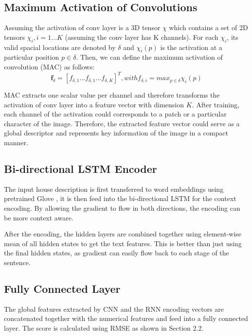 \documentclass{article} %
\begin{document}
\subsection{Maximum Activation of Convolutions}

Assuming the activation of conv layer is a 3D tensor $\chi$
which contains a set of 2D tensors $\chi_i, i = 1...K$
(assuming the conv layer has K channels).
For each $\chi_i$, its valid spacial locations are denoted by $\delta$
and $\chi_i(p)$ is the activation at a particular position $p \in \delta$.
Then, we can define the maximum activation of convolution (MAC) as follows\cite{salvador2016faster}:
\begin{equation*}
\textbf{f}_{\delta} = [f_{\delta, 1} ... f_{\delta, 1} ... f_{\delta, K}]^T, with f_{\delta, i} = max_{p\in \delta}\chi_i(p)
\end{equation*}

MAC extracts one scalar value per channel and therefore transforms
the activation of conv layer into a feature vector with dimension $K$.
After training, each channel of the activation could corresponds to
a patch or a particular character of the image.
Therefore, the extracted feature vector could serve as a global 
descriptor and represents key information of the image in a compact manner.

\subsection{Bi-directional LSTM Encoder}

The input house description is first transferred to word embeddings
using pretrained Glove \cite{pennington2014glove},
it is then feed into the bi-directional LSTM for the context encoding.
By allowing the gradient to flow in both directions,
the encoding can be more context aware.

After the encoding, the hidden layers are combined together using
element-wise mean of all hidden states to get the text features.
This is better than just using the final hidden states,
as gradient can easily flow back to each stage of the sentence.

\subsection{Fully Connected Layer}

The global features extracted by CNN and the RNN encoding vectors
are concatenated together with the numerical features and feed into a fully connected layer.
The score is calculated using RMSE as shown in Section 2.2.
\end{document}
